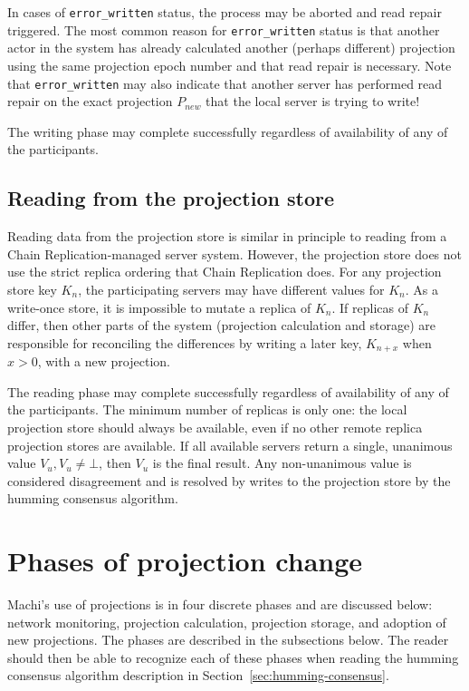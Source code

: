 \documentclass[preprint,10pt]{sigplanconf}
\begin{document}
In cases of {\tt error\_written} status,
the process may be aborted and read repair
triggered.  The most common reason for {\tt error\_written} status
is that another actor in the system has
already calculated another (perhaps different) projection using the
same projection epoch number and that
read repair is necessary.  Note that {\tt error\_written} may also
indicate that another server has performed read repair on the exact
projection $P_{new}$ that the local server is trying to write!

The writing phase may complete successfully regardless of availability
of any of the participants.

\subsection{Reading from the projection store}
\label{sub:proj-store-reading}

Reading data from the projection store is similar in principle to
reading from a Chain Replication-managed server system.  However, the
projection store does not use the strict replica ordering that
Chain Replication does.  For any projection store key $K_n$, the
participating servers may have different values for $K_n$.  As a
write-once store, it is impossible to mutate a replica of $K_n$.  If
replicas of $K_n$ differ, then other parts of the system (projection
calculation and storage) are responsible for reconciling the
differences by writing a later key,
$K_{n+x}$ when $x>0$, with a new projection.

The reading phase may complete successfully regardless of availability
of any of the participants.
The minimum number of replicas is only one: the local projection store
should always be available, even if no other remote replica projection
stores are available.
If all available servers return a single, unanimous value $V_u, V_u
\ne \bot$, then $V_u$ is the final result.  Any non-unanimous value is
considered disagreement and is resolved by writes to the projection
store by the humming consensus algorithm.

\section{Phases of projection change}
\label{sec:phases-of-projection-change}

Machi's use of projections is in four discrete phases and are
discussed below: network monitoring,
projection calculation, projection storage, and
adoption of new projections.  The phases are described in the
subsections below.  The reader should then be able to recognize each
of these phases when reading the humming consensus algorithm
description in Section~\ref{sec:humming-consensus}.
\end{document}
